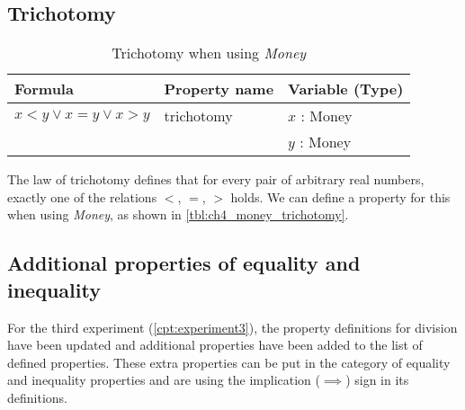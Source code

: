 \subsection*{Trichotomy}
\label{ssct:properties_trichotomy}
\begin{table}[!ht]
\centering
\begin{tabular}{lll}
\hline
                        \textbf{Formula}                   & \textbf{Property name} & \textbf{Variable (Type)} \\ \hline
\rowcolor[HTML]{EFEFEF} $x < y \lor x = y \lor x > y$ & trichotomy             & $x$ : Money              \\
\rowcolor[HTML]{EFEFEF}                                    &                        & $y$ : Money              \\ \hline
\end{tabular}
\caption{Trichotomy when using \textit{Money}}
\label{tbl:ch4_money_trichotomy}
\end{table}
\FloatBarrier\noindent
The law of trichotomy defines that for every pair of arbitrary real numbers,
exactly one of the relations \textit{$<$}, \textit{$=$}, \textit{$>$} holds. We
can define a property for this when using \textit{Money}, as shown in
\autoref{tbl:ch4_money_trichotomy}.
\clearpage %
\subsection{Additional properties of equality and inequality}
\label{ssct:properties_definitions_additionalproperties}
For the third experiment (\autoref{cpt:experiment3}), the property definitions for division have been updated and additional properties have
been added to the list of defined properties. These extra properties can be put in the category of equality and
inequality properties and are using the implication ($\implies$) sign in its
definitions.

